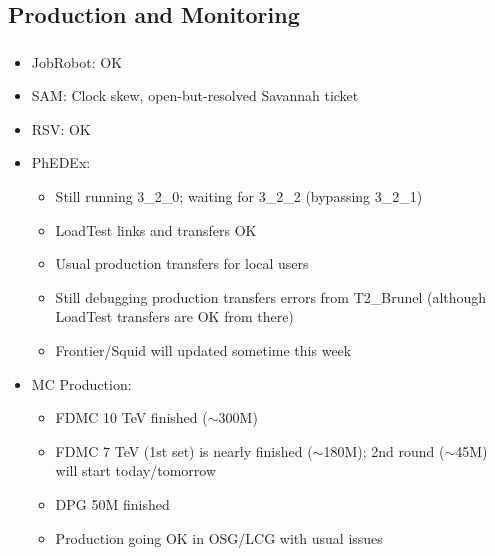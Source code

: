 \documentclass{beamer}
\newcommand{\ca}{\ensuremath{\sim}}
\begin{document}
\subsection{Production and Monitoring}
\begin{frame}
\frametitle{}
\begin{itemize}
	\item JobRobot: OK
	\item SAM: Clock skew, open-but-resolved Savannah ticket
	\item RSV: OK
	\item PhEDEx:

	\begin{itemize}
		\item Still running 3\_2\_0; waiting for 3\_2\_2 (bypassing 3\_2\_1)
		\item LoadTest links and transfers OK
		\item Usual production transfers for local users
		\item Still debugging production transfers errors from T2\_Brunel (although LoadTest transfers are OK from there)
		\item Frontier/Squid will updated sometime this week
	\end{itemize}

	\item MC Production:
	\begin{itemize}
		\item FDMC 10 TeV finished (\ca{}300M)
		\item FDMC 7 TeV (1st set) is nearly finished (\ca{}180M); 2nd round (\ca{}45M) will start today/tomorrow
		\item DPG 50M finished
		\item Production going OK in OSG/LCG with usual issues
	\end{itemize}

\end{itemize}
\end{frame}
\end{document}
